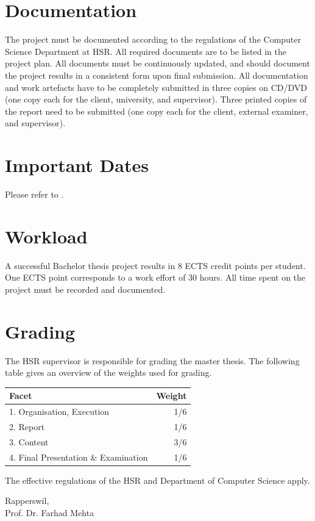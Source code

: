 \documentclass[a4paper]{article}
\begin{document}
\section{Documentation}
The project must be documented according to the regulations of the Computer
Science Department at
HSR\cite{hsr:general}. All
required documents are to be listed in the project plan. All documents must be
continuously updated, and should document the project results in a consistent
form upon final submission. All documentation and work artefacts have to be
completely submitted in three copies on CD/DVD (one copy each for the client,
university, and supervisor). Three printed copies of the report need to be
submitted (one copy each for the client, external examiner, and supervisor).

\section{Important Dates}
Please refer to \cite{hsr:dates}.

\section{Workload}
A successful Bachelor thesis project results in 8 ECTS credit points per
student. One ECTS point corresponds to a work effort of 30 hours.
All time spent on the project must be recorded and documented.

\section{Grading}
The HSR supervisor is responsible for grading the master thesis. The following
table gives an overview of the weights used for grading.\\


\begin{center}
\noindent
\begin{tabulary}{1.0\textwidth}{| L | R |}
	\hline
	Facet & Weight \\ . Organisation, Execution	& 1/6 \\
	2. Report	& 1/6 \\
	3. Content	& 3/6 \\
	4. Final Presentation \& Examination & 1/6 \\
	\hline
\end{tabulary}
\end{center}
\noindent
The effective regulations of the HSR and Department of Computer
Science\cite{hsr:rules}
apply.
\vspace{2cm}


\noindent
Rapperswil, \underline{\hspace{4cm}}\\
Prof. Dr. Farhad Mehta

\footnotesize %
\printbibliography
\end{document}
